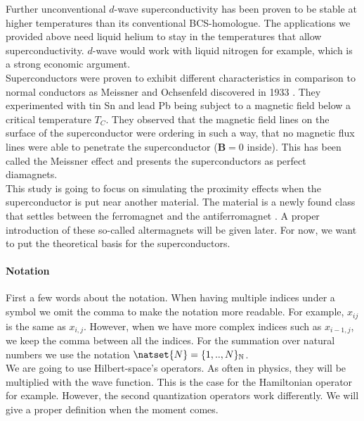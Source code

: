\documentclass[../main.tex]{subfile}
\begin{document}
Further unconventional $d$-wave superconductivity has been proven to be stable at higher temperatures than its conventional BCS-homologue.
The applications we provided above need liquid helium to stay in the temperatures that allow superconductivity. $d$-wave
would work with liquid nitrogen for example, which is a strong economic argument.\\

Superconductors were proven to exhibit different characteristics in comparison to normal conductors as
Meissner and Ochsenfeld discovered in 1933 \cite{MeissnerOchsenfeld1933}. 
They experimented with tin Sn and lead Pb being subject to a magnetic field below a critical temperature $T_C$. They observed that the magnetic field lines on the surface
of the superconductor were ordering in such a way, that no magnetic flux lines were able to penetrate the superconductor ($\bm{B} = 0$ inside). This has been called the Meissner effect
and presents the superconductors as perfect diamagnets.\\

This study is going to focus on simulating the proximity effects when the superconductor is put near another material. The material is a newly found class 
that settles between the ferromagnet and the antiferromagnet \cite{Smejkal2022}. A proper introduction of these so-called altermagnets will be given later.
 For now, we want to put the theoretical basis for the superconductors.\\

\paragraph{Notation}$~$\\

First a few words about the notation. When having multiple indices under a symbol we omit the comma to make the notation more readable. 
For example, $x_{ij}$ is the same as $x_{i,j}$. However, when we have more complex indices such as $x_{i-1, j}$, we keep the comma between all
the indices. For the summation over natural numbers we use the notation $\natset{N} = \{1,..,N\}_{\mathbb{N}}$.\\

We are going to use Hilbert-space's operators. As often in physics, they will be multiplied with the wave function. This is the case for the Hamiltonian 
operator for example. However, the second quantization operators work differently. We will give a proper definition when the moment comes.
\end{document}
